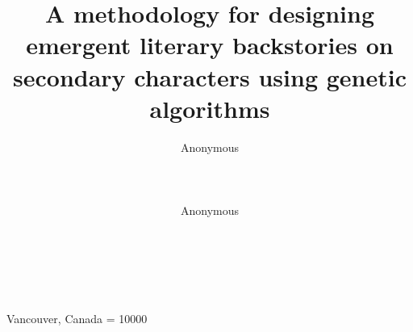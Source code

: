 \documentclass{sig-alternate}
\begin{document}
%
 {Vancouver, Canada}
    \widowpenalty = 10000



\title{A methodology for designing emergent literary backstories on secondary characters using genetic algorithms}



 \author{
 \alignauthor
 Anonymous\\
        \\
        \\
        \\
 \alignauthor
 Anonymous\\
 \\
 \\
 \\
 }


\maketitle


\end{document}
